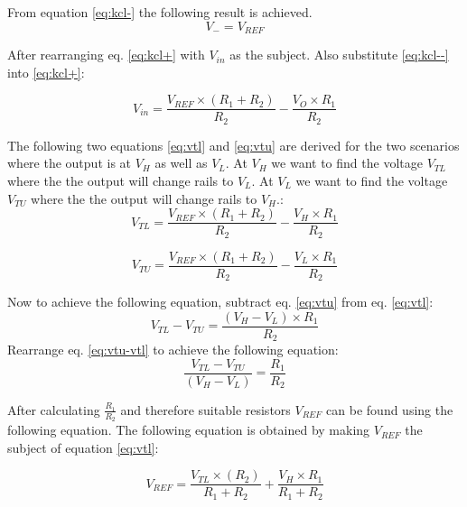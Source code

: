 From equation \ref{eq:kcl-} the following result is achieved.
\begin{equation}
	V_-=V_{REF}
	\label{eq:kcl--}
\end{equation}


After rearranging eq. \ref{eq:kcl+} with $V_{in}$ as the subject. Also substitute \ref{eq:kcl--} into \ref{eq:kcl+}:

		\begin{equation}
V_{in}=\frac{V_{REF}\times (R_1+R_2)}{R_2}-\frac{V_{O}\times R_1}{R_2}
\end{equation}

The following two equations \ref{eq:vtl} and \ref{eq:vtu} are derived for the two scenarios where the output is at $V_H$ as well as $V_L$. At $V_H$ we want to find the voltage $V_{TL}$ where the the output will change rails to $V_L$. At $V_L$ we want to find the voltage $V_{TU}$ where the the output will change rails to $V_H$.:
\begin{equation}
	V_{TL}=\frac{V_{REF}\times (R_1+R_2)}{R_2}-\frac{V_{H}\times R_1}{R_2}
	\label{eq:vtl}
\end{equation}
	
	
	\begin{equation}
	V_{TU}=\frac{V_{REF}\times (R_1+R_2)}{R_2}-\frac{V_{L}\times R_1}{R_2}
	\label{eq:vtu}
\end{equation}

Now to achieve the following equation, subtract eq. \ref{eq:vtu} from eq. \ref{eq:vtl}:
\begin{equation}
		V_{TL}-V_{TU}=\frac{(V_{H}-V_L)\times R_1}{R_2}
			\label{eq:vtu-vtl}
	\end{equation}
		Rearrange eq. \ref{eq:vtu-vtl} to achieve the following equation:
		\begin{equation}
	\frac{V_{TL}-V_{TU}}{(V_{H}-V_L)}=\frac{R_1}{R_2}
\end{equation}

After calculating $\frac{R_1}{R_2}$ and therefore suitable resistors $V_{REF}$ can be found using the following equation. The following equation is obtained by making $V_{REF}$ the subject of equation \ref{eq:vtl}:

\begin{equation}
	V_{REF}=\frac{V_{TL}\times (R_2)}{R_1+R_2}+\frac{V_{H}\times R_1}{R_1+R_2}
	\label{eq:reff}
\end{equation}







